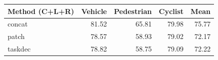 \begin{tabular}{lrrrr}
\hline
Method (C+L+R) & Vehicle & Pedestrian & Cyclist & Mean \\
\hline
concat & 81.52 & 65.81 & 79.98 & 75.77 \\
patch & 78.57 & 58.93 & 79.02 & 72.17 \\
taskdec & 78.82 & 58.75 & 79.09 & 72.22 \\
\hline
\end{tabular}
